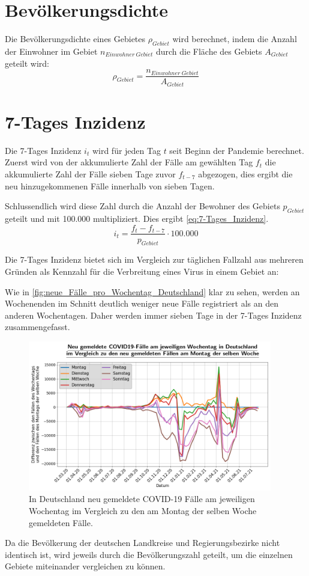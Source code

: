 \section{Bevölkerungsdichte}
Die Bevölkerungsdichte eines Gebietes $\rho_{Gebiet}$ wird berechnet, indem die Anzahl der Einwohner im Gebiet $n_{Einwohner\ Gebiet}$ durch die Fläche des Gebiets $A_{Gebiet}$ geteilt wird:
\begin{equation}\label{eq:Bevölkerungsdichte}
    \rho_{Gebiet} = \frac{n_{Einwohner\  Gebiet}}{A_{Gebiet}}
\end{equation}
\section{7-Tages Inzidenz}\label{sec:Datenaufbereitung}
Die 7-Tages Inzidenz $i_t$ wird für jeden Tag $t$ seit Beginn der Pandemie berechnet.
Zuerst wird von der akkumulierte Zahl der Fälle am gewählten Tag $f_t$ die akkumulierte Zahl der Fälle sieben Tage zuvor $f_{t-7}$ abgezogen, dies ergibt die neu hinzugekommenen Fälle innerhalb von sieben Tagen.

Schlussendlich wird diese Zahl durch die Anzahl der Bewohner des Gebiets $p_{Gebiet}$ geteilt und mit 100.000 multipliziert. Dies ergibt \autoref{eq:7-Tages_Inzidenz}.
\begin{equation}\label{eq:7-Tages_Inzidenz}
    i_t= \frac{f_t-f_{t-7}}{p_{Gebiet}}\cdot 100.000
\end{equation}

Die 7-Tages Inzidenz bietet sich im Vergleich zur täglichen Fallzahl aus mehreren Gründen als Kennzahl für die Verbreitung eines Virus in einem Gebiet an:

Wie in \autoref{fig:neue_Fälle_pro_Wochentag_Deutschland} klar zu sehen, werden an Wochenenden im Schnitt deutlich weniger neue Fälle registriert als an den anderen Wochentagen.
Daher werden immer sieben Tage in der 7-Tages Inzidenz zusammengefasst.
\begin{figure}[H]
    \centering
    \includegraphics[width=0.95\textwidth]{figures/Grundlagen/neue_Fälle_pro_Wochentag_Deutschland.png}
    \caption{In Deutschland neu gemeldete COVID-19 Fälle am jeweiligen Wochentag im Vergleich zu den am Montag der selben Woche gemeldeten Fälle.}
    \label{fig:neue_Fälle_pro_Wochentag_Deutschland}
\end{figure}
Da die Bevölkerung der deutschen Landkreise und Regierungsbezirke nicht identisch ist, wird jeweils durch die Bevölkerungszahl geteilt, um die einzelnen Gebiete miteinander vergleichen zu können.

